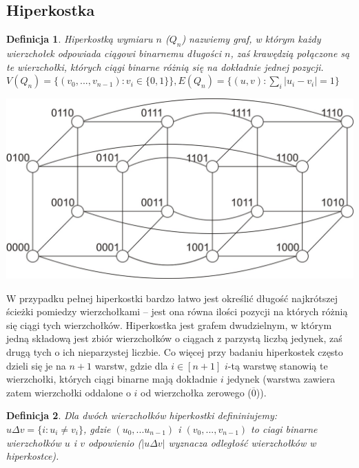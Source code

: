 \documentclass{pracamgr}
\newtheorem{defi}{Definicja}[section] %
\begin{document}
   \subsection{Hiperkostka}
    \begin{defi}\label{hiperkostka}
     \emph{Hiperkostką wymiaru $n$ ($Q_n$)} nazwiemy graf, w którym każdy wierzchołek odpowiada ciągowi binarnemu długości $n$,
     zaś krawędzią połączone są te wierzchołki, których ciągi binarne różnią się na dokładnie jednej pozycji.\newline
     $V(Q_n)=\{(v_0,...,v_{n-1}):v_i\in\{0,1\}\}, E(Q_n)=\{(u,v):\sum_{i}|u_i-v_i|=1\}$
    \end{defi}
    \begin{center}
     \includegraphics[scale=0.6]{img/Q_4.jpg}
    \end{center}
    W przypadku pełnej hiperkostki
    bardzo łatwo jest określić długość najkrótszej ścieżki pomiedzy wierzchołkami --
    jest ona równa ilości pozycji na których różnią się ciągi tych wierzchołków.\newline
    Hiperkostka jest grafem dwudzielnym, w którym jedną składową jest zbiór wierzchołków o ciągach z parzystą liczbą jedynek,
    zaś drugą tych o ich nieparzystej liczbie.\newline
    Co więcej przy badaniu hiperkostek często dzieli się je na $n+1$ warstw, gdzie dla $i\in[n+1]$ $i$-tą warstwę stanowią te wierzchołki,
    których ciągi binarne mają dokładnie $i$ jedynek (warstwa zawiera zatem wierzchołki oddalone o $i$ od wierzchołka zerowego ($\overline{0}$)).
    \begin{defi}\label{delta wierzcholkow}
     Dla dwóch wierzchołków hiperkostki defininiujemy:
     $u\Delta v=\{i:u_i\neq v_i\}$, gdzie $(u_0,...u_{n-1})$ i $(v_0,...,v_{n-1})$ to ciagi binarne wierzchołków $u$ i $v$ odpowienio
     ($|u\Delta v|$ wyznacza odległość wierzchołków w hiperkostce).
    \end{defi}
\end{document}
